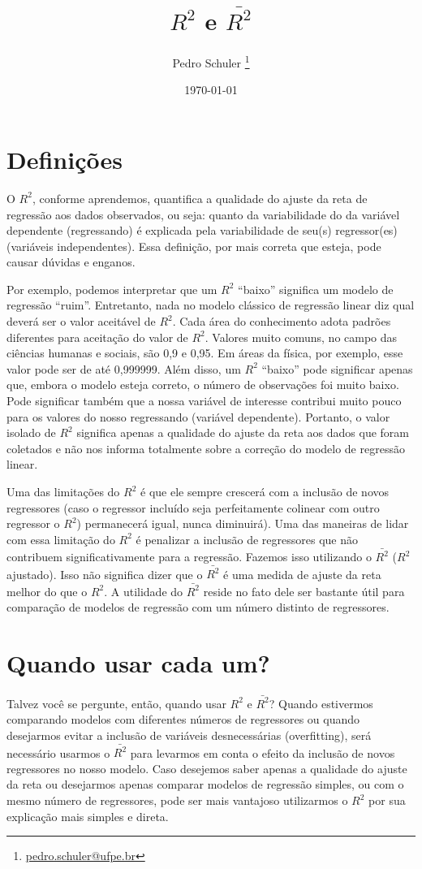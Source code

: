 \documentclass[12pt,a4paper,titlepage=false]{scrartcl}
\title{\(R^{2}\) e \(\bar{R^{2}}\)}
\author{Pedro Schuler \thanks{\href{mailto:pedro.schuler@ufpe.br}{pedro.schuler@ufpe.br}}}
\date{\today}
\begin{document}
\maketitle

\section{Definições}
O \(R^{2}\), conforme aprendemos, quantifica a qualidade do ajuste da reta de regressão aos dados observados, ou seja: quanto da variabilidade do da variável dependente (regressando) é explicada pela variabilidade de seu(s) regressor(es) (variáveis independentes). Essa definição, por mais correta que esteja, pode causar dúvidas e enganos.

Por exemplo, podemos interpretar que um \(R^{2}\) \enquote{baixo} significa um modelo de regressão \enquote{ruim}. Entretanto, nada no modelo clássico de regressão linear diz qual deverá ser o valor aceitável de \(R^{2}\). Cada área do conhecimento adota padrões diferentes para aceitação do valor de \(R^{2}\). Valores muito comuns, no campo das ciências humanas e sociais, são 0,9 e 0,95. Em áreas da física, por exemplo, esse valor pode ser de até 0,999999. Além disso, um \(R^{2}\) \enquote{baixo} pode significar apenas que, embora o modelo esteja correto, o número de observações foi muito baixo. Pode significar também que a nossa variável de interesse contribui muito pouco para os valores do nosso regressando (variável dependente). Portanto, o valor isolado de \(R^{2}\) significa apenas a qualidade do ajuste da reta aos dados que foram coletados e não nos informa totalmente sobre a correção do modelo de regressão linear.

Uma das limitações do \(R^{2}\) é que ele sempre crescerá com a inclusão de novos regressores (caso o regressor incluído seja perfeitamente colinear com outro regressor o \(R^{2}\)) permanecerá igual, nunca diminuirá). Uma das maneiras de lidar com essa limitação do \(R^{2}\) é penalizar a inclusão de regressores que não contribuem significativamente para a regressão. Fazemos isso utilizando o \(\bar{R^{2}}\) (\(R^{2}\) ajustado). Isso não significa dizer que o \(\bar{R^{2}}\) é uma medida de ajuste da reta melhor do que o \(R^{2}\). A utilidade do \(\bar{R^{2}}\) reside no fato dele ser bastante útil para comparação de modelos de regressão com um número distinto de regressores.

\section{Quando usar cada um?}
Talvez você se pergunte, então, quando usar \(R^{2}\) e \(\bar{R^{2}}\)? Quando estivermos comparando modelos com diferentes números de regressores ou quando desejarmos evitar a inclusão de variáveis desnecessárias (overfitting), será necessário usarmos o \(\bar{R^{2}}\) para levarmos em conta o efeito da inclusão de novos regressores no nosso modelo. Caso desejemos saber apenas a qualidade do ajuste da reta ou desejarmos apenas comparar modelos de regressão simples, ou com o mesmo número de regressores, pode ser mais vantajoso utilizarmos o \(R^{2}\) por sua explicação mais simples e direta.
\end{document}
